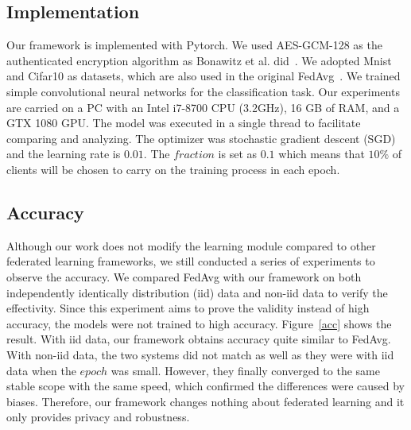 \subsection{Implementation}
Our framework is implemented with Pytorch. We used AES-GCM-128 as the authenticated encryption algorithm as Bonawitz et al. did~\cite{Practical}. We adopted Mnist and Cifar10 as datasets, which are also used in the original FedAvg~\cite{mcmahan2016communicationefficient}. We trained simple convolutional neural networks for the classification task. Our experiments are carried on a PC with an Intel i7-8700 CPU (3.2GHz), 16 GB of RAM, and a GTX 1080 GPU. The model was executed in a single thread to facilitate comparing and analyzing. The optimizer was stochastic gradient descent (SGD) and the learning rate is $0.01$. The $fraction$ is set as $0.1$ which means that $10\%$ of clients will be chosen to carry on the training process in each epoch. 


\subsection{Accuracy}
Although our work does not modify the learning module compared to other federated learning frameworks, we still conducted a series of experiments to observe the accuracy. We compared FedAvg with our framework on both independently identically distribution (iid) data and non-iid data to verify the effectivity. Since this experiment aims to prove the validity instead of high accuracy, the models were not trained to high accuracy. Figure~\ref{acc} shows the result. With iid data, our framework obtains accuracy quite similar to FedAvg. With non-iid data, the two systems did not match as well as they were with iid data when the $epoch$ was small. However, they finally converged to the same stable scope with the same speed, which confirmed the differences were caused by biases. Therefore, our framework changes nothing about federated learning and it only provides privacy and robustness. 

